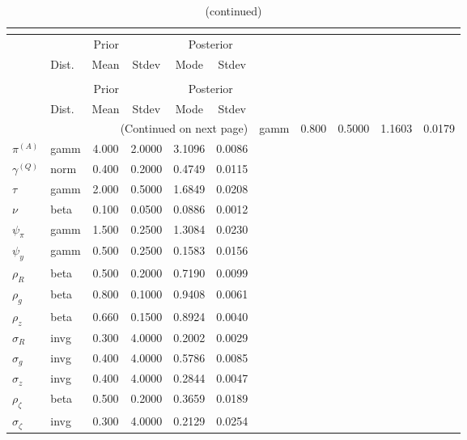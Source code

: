  
\begin{center}
\begin{longtable}{llcccc} 
\caption{Results from posterior maximization (parameters)}\\
 \label{Table:Posterior:1}\\
\toprule 
  & \multicolumn{3}{c}{Prior}  &  \multicolumn{2}{c}{Posterior} \\
  \cmidrule(r{.75em}){2-4} \cmidrule(r{.75em}){5-6}
  & Dist. & Mean  & Stdev & Mode & Stdev \\ 
\midrule \endfirsthead 
\caption{(continued)}\\
 \bottomrule 
  & \multicolumn{3}{c}{Prior}  &  \multicolumn{2}{c}{Posterior} \\
  \cmidrule(r{.75em}){2-4} \cmidrule(r{.75em}){5-6}
  & Dist. & Mean  & Stdev & Mode & Stdev \\ 
\midrule \endhead 
\bottomrule \multicolumn{6}{r}{(Continued on next page)}\endfoot 
\bottomrule\endlastfoot 
${r_{A}}$ & gamm &   0.800 & 0.5000 &   1.1603 &  0.0179 \\ 
${\pi^{(A)}}$ & gamm &   4.000 & 2.0000 &   3.1096 &  0.0086 \\ 
${\gamma^{(Q)}}$ & norm &   0.400 & 0.2000 &   0.4749 &  0.0115 \\ 
${\tau}$ & gamm &   2.000 & 0.5000 &   1.6849 &  0.0208 \\ 
${\nu}$ & beta &   0.100 & 0.0500 &   0.0886 &  0.0012 \\ 
${\psi_\pi}$ & gamm &   1.500 & 0.2500 &   1.3084 &  0.0230 \\ 
${\psi_y}$ & gamm &   0.500 & 0.2500 &   0.1583 &  0.0156 \\ 
${\rho_R}$ & beta &   0.500 & 0.2000 &   0.7190 &  0.0099 \\ 
${\rho_{g}}$ & beta &   0.800 & 0.1000 &   0.9408 &  0.0061 \\ 
${\rho_z}$ & beta &   0.660 & 0.1500 &   0.8924 &  0.0040 \\ 
${\sigma_R}$ & invg &   0.300 & 4.0000 &   0.2002 &  0.0029 \\ 
${\sigma_{g}}$ & invg &   0.400 & 4.0000 &   0.5786 &  0.0085 \\ 
${\sigma_z}$ & invg &   0.400 & 4.0000 &   0.2844 &  0.0047 \\ 
${\rho_\zeta}$ & beta &   0.500 & 0.2000 &   0.3659 &  0.0189 \\ 
${\sigma_\zeta}$ & invg &   0.300 & 4.0000 &   0.2129 &  0.0254 \\ 
\end{longtable}
 \end{center}
